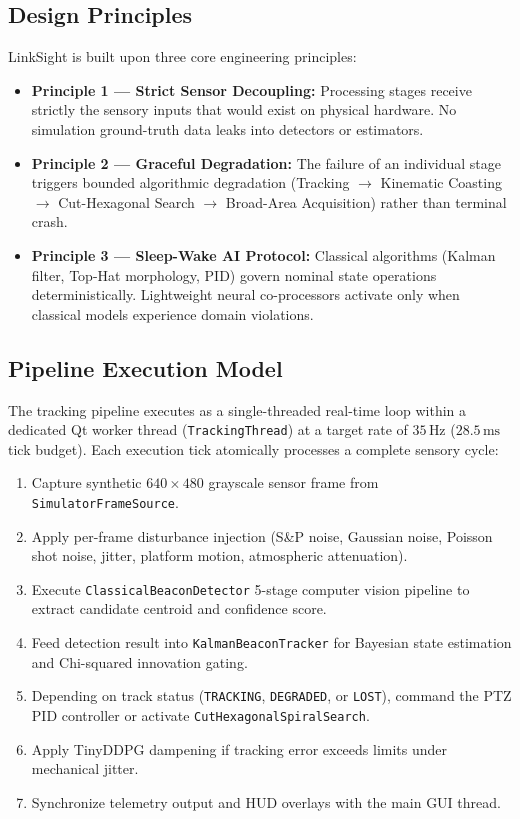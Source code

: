 \documentclass[11pt,a4paper]{article}
\begin{document}
\subsection{Design Principles}
LinkSight is built upon three core engineering principles:
\begin{itemize}[noitemsep,topsep=2pt]
    \item \textbf{Principle 1 — Strict Sensor Decoupling:} Processing stages receive strictly the sensory inputs that would exist on physical hardware. No simulation ground-truth data leaks into detectors or estimators.
    \item \textbf{Principle 2 — Graceful Degradation:} The failure of an individual stage triggers bounded algorithmic degradation (Tracking $\rightarrow$ Kinematic Coasting $\rightarrow$ Cut-Hexagonal Search $\rightarrow$ Broad-Area Acquisition) rather than terminal crash.
    \item \textbf{Principle 3 — Sleep-Wake AI Protocol:} Classical algorithms (Kalman filter, Top-Hat morphology, PID) govern nominal state operations deterministically. Lightweight neural co-processors activate only when classical models experience domain violations.
\end{itemize}

\subsection{Pipeline Execution Model}
The tracking pipeline executes as a single-threaded real-time loop within a dedicated Qt worker thread (\texttt{TrackingThread}) at a target rate of $35\,\text{Hz}$ ($28.5\,\text{ms}$ tick budget). Each execution tick atomically processes a complete sensory cycle:
\begin{enumerate}[noitemsep,topsep=2pt]
    \item Capture synthetic $640\times 480$ grayscale sensor frame from \texttt{SimulatorFrameSource}.
    \item Apply per-frame disturbance injection (S\&P noise, Gaussian noise, Poisson shot noise, jitter, platform motion, atmospheric attenuation).
    \item Execute \texttt{ClassicalBeaconDetector} 5-stage computer vision pipeline to extract candidate centroid and confidence score.
    \item Feed detection result into \texttt{KalmanBeaconTracker} for Bayesian state estimation and Chi-squared innovation gating.
    \item Depending on track status (\texttt{TRACKING}, \texttt{DEGRADED}, or \texttt{LOST}), command the PTZ PID controller or activate \texttt{CutHexagonalSpiralSearch}.
    \item Apply TinyDDPG dampening if tracking error exceeds limits under mechanical jitter.
    \item Synchronize telemetry output and HUD overlays with the main GUI thread.
\end{enumerate}
\end{document}
